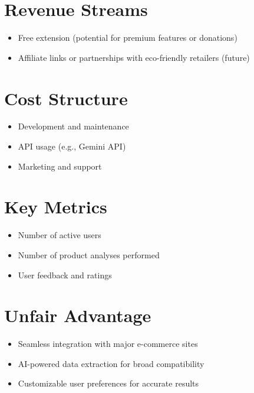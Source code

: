\documentclass{article}
\begin{document}
\section*{Revenue Streams}
\begin{itemize}
  \item Free extension (potential for premium features or donations)
  \item Affiliate links or partnerships with eco-friendly retailers (future)
\end{itemize}

\section*{Cost Structure}
\begin{itemize}
  \item Development and maintenance
  \item API usage (e.g., Gemini API)
  \item Marketing and support
\end{itemize}

\section*{Key Metrics}
\begin{itemize}
  \item Number of active users
  \item Number of product analyses performed
  \item User feedback and ratings
\end{itemize}

\section*{Unfair Advantage}
\begin{itemize}
  \item Seamless integration with major e-commerce sites
  \item AI-powered data extraction for broad compatibility
  \item Customizable user preferences for accurate results
\end{itemize}
\end{document}
